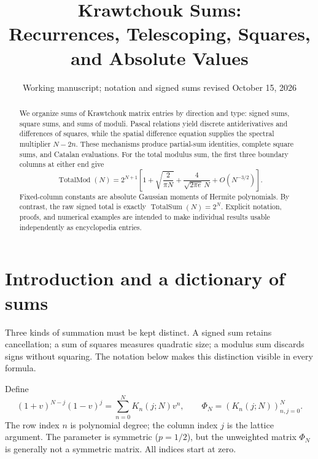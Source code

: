 \documentclass[11pt,reqno]{amsart}
\title[Krawtchouk sums]{Krawtchouk Sums:\\Recurrences, Telescoping, Squares, and Absolute Values}
\date{Working manuscript; notation and signed sums revised October 15, 2026}
\theoremstyle{remark}\newtheorem{remark}[theorem]{Remark}
\DeclareMathOperator{\TotalSum}{TotalSum}
\DeclareMathOperator{\TotalMod}{TotalMod}
\begin{document}
\begin{abstract}
We organize sums of Krawtchouk matrix entries by direction and type: signed sums, square sums, and sums of moduli. Pascal relations yield discrete antiderivatives and differences of squares, while the spatial difference equation supplies the spectral multiplier $N-2n$. These mechanisms produce partial-sum identities, complete square sums, and Catalan evaluations. For the total modulus sum, the first three boundary columns at either end give
\[
\TotalMod(N)=2^{N+1}\left[1+\sqrt{\frac{2}{\pi N}}+
\frac{4}{\sqrt{2\pi e}\,N}+O(N^{-3/2})\right].
\]
Fixed-column constants are absolute Gaussian moments of Hermite polynomials. By contrast, the raw signed total is exactly $\TotalSum(N)=2^N$. Explicit notation, proofs, and numerical examples are intended to make individual results usable independently as encyclopedia entries.
\end{abstract}
\maketitle
\tableofcontents

\section{Introduction and a dictionary of sums}\label{sec:dictionary}
Three kinds of summation must be kept distinct. A signed sum retains cancellation; a sum of squares measures quadratic size; a modulus sum discards signs without squaring. The notation below makes this distinction visible in every formula.

Define
\begin{equation}\label{gen}
(1+v)^{N-j}(1-v)^j=\sum_{n=0}^N K_n(j;N)v^n,
\qquad \Phi_N=(K_n(j;N))_{n,j=0}^N.
\end{equation}
The row index $n$ is polynomial degree; the column index $j$ is the lattice argument. The parameter is symmetric ($p=1/2$), but the unweighted matrix $\Phi_N$ is generally not a symmetric matrix. All indices start at zero.
\end{document}
